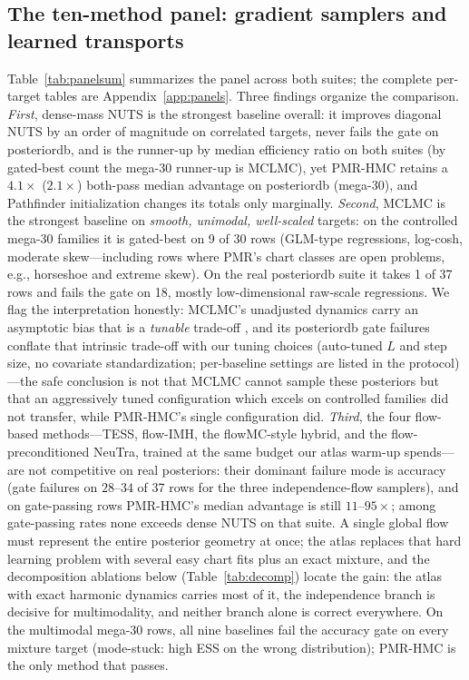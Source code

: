 \documentclass[11pt]{article}
\theoremstyle{remark}
\begin{document}
\subsection{The ten-method panel: gradient samplers and learned
transports}\label{sec:panel}
Table~\ref{tab:panelsum} summarizes the panel across both suites; the
complete per-target tables are Appendix~\ref{app:panels}. Three
findings organize the comparison. \emph{First}, dense-mass NUTS is the
strongest baseline overall: it improves diagonal NUTS by an order of
magnitude on correlated targets, never fails the gate on posteriordb,
and is the runner-up by median efficiency ratio on both suites (by
gated-best count the mega-30 runner-up is MCLMC), yet PMR-HMC retains
a $4.1\times$ ($2.1\times$) both-pass median advantage on posteriordb
(mega-30), and Pathfinder initialization changes its totals only
marginally. \emph{Second}, MCLMC is the strongest baseline on
\emph{smooth, unimodal, well-scaled} targets: on the controlled mega-30
families it is gated-best on 9 of 30 rows (GLM-type regressions,
log-cosh, moderate skew---including rows where PMR's chart classes are
open problems, e.g., horseshoe and extreme skew). On the real
posteriordb suite it takes 1 of 37 rows and fails the gate on 18,
mostly low-dimensional raw-scale regressions. We flag the
interpretation honestly: MCLMC's unadjusted dynamics carry an
asymptotic bias that is a \emph{tunable} trade-off
\citep{robnik2023}, and its posteriordb gate failures conflate that
intrinsic trade-off with our tuning choices (auto-tuned $L$ and step
size, no covariate standardization; per-baseline settings are listed
in the protocol)---the safe conclusion is not that MCLMC cannot
sample these posteriors but that an aggressively tuned configuration
which excels on controlled families did not transfer, while PMR-HMC's
single configuration did. \emph{Third}, the four flow-based
methods---TESS, flow-IMH, the flowMC-style hybrid, and the
flow-preconditioned NeuTra, trained at the same budget our atlas
warm-up spends---are not competitive on real posteriors: their
dominant failure mode is accuracy (gate failures on $28$--$34$ of 37
rows for the three independence-flow samplers), and on gate-passing
rows PMR-HMC's median advantage is still $11$--$95\times$; among
gate-passing rates none exceeds dense NUTS on that suite. A single
global flow must represent the entire posterior geometry at once; the
atlas replaces that hard learning problem with several easy chart fits
plus an exact mixture, and the decomposition ablations below
(Table~\ref{tab:decomp}) locate the gain: the atlas with exact
harmonic dynamics carries most of it, the independence branch is
decisive for multimodality, and neither branch alone is correct
everywhere. On the multimodal mega-30 rows,
all nine baselines fail the accuracy gate on every mixture target
(mode-stuck: high ESS on the wrong distribution); PMR-HMC is the only
method that passes.
\end{document}

